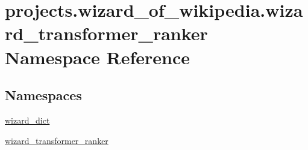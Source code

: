 \hypertarget{namespaceprojects_1_1wizard__of__wikipedia_1_1wizard__transformer__ranker}{}\section{projects.\+wizard\+\_\+of\+\_\+wikipedia.\+wizard\+\_\+transformer\+\_\+ranker Namespace Reference}
\label{namespaceprojects_1_1wizard__of__wikipedia_1_1wizard__transformer__ranker}
\subsection*{Namespaces}
\begin{DoxyCompactItemize}
\item 
 \hyperlink{namespaceprojects_1_1wizard__of__wikipedia_1_1wizard__transformer__ranker_1_1wizard__dict}{wizard\+\_\+dict}
\item 
 \hyperlink{namespaceprojects_1_1wizard__of__wikipedia_1_1wizard__transformer__ranker_1_1wizard__transformer__ranker}{wizard\+\_\+transformer\+\_\+ranker}
\end{DoxyCompactItemize}
